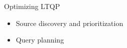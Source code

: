 \begin{frame}{Optimizing LTQP}
    \begin{itemize}
        \item Source discovery and prioritization
        \item Query planning
    \end{itemize}
\end{frame}